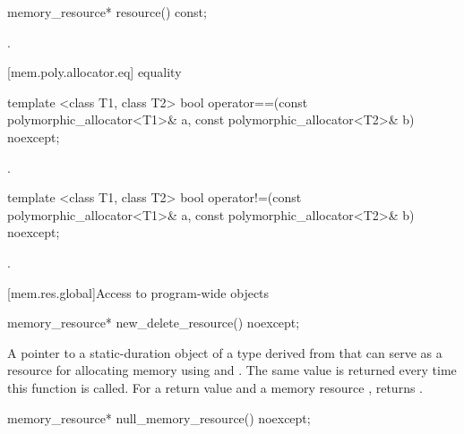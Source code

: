 %
\begin{itemdecl}
memory_resource* resource() const;
\end{itemdecl}

\begin{itemdescr}
\pnum
\returns
{}.
\end{itemdescr}

[mem.poly.allocator.eq]{ equality}

%
\begin{itemdecl}
template <class T1, class T2>
  bool operator==(const polymorphic_allocator<T1>& a,
                  const polymorphic_allocator<T2>& b) noexcept;
\end{itemdecl}

\begin{itemdescr}
\pnum
\returns
{}.
\end{itemdescr}

%
\begin{itemdecl}
template <class T1, class T2>
  bool operator!=(const polymorphic_allocator<T1>& a,
                  const polymorphic_allocator<T2>& b) noexcept;
\end{itemdecl}

\begin{itemdescr}
\pnum
\returns
{}.
\end{itemdescr}


[mem.res.global]{Access to program-wide  objects}

%
\begin{itemdecl}
memory_resource* new_delete_resource() noexcept;
\end{itemdecl}

\begin{itemdescr}
\pnum
\returns
A pointer to a static-duration object of a type derived from 
that can serve as a resource for allocating memory
using  and .
The same value is returned every time this function is called.
For a return value  and a memory resource ,
 returns .
\end{itemdescr}

%
\begin{itemdecl}
memory_resource* null_memory_resource() noexcept;
\end{itemdecl}

